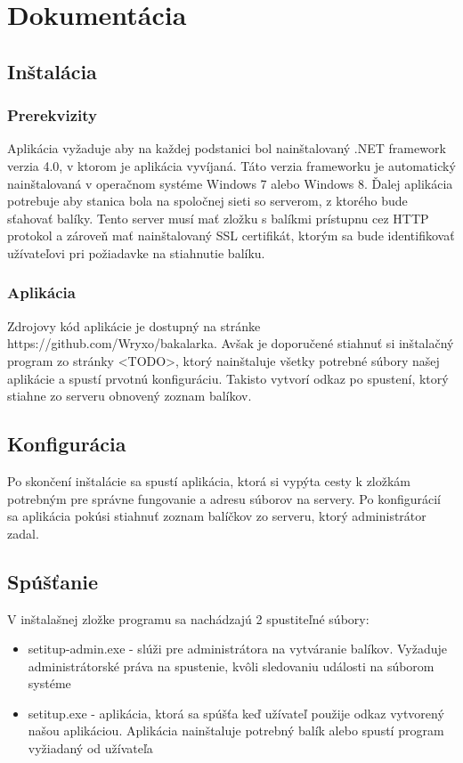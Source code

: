 \chapter{Dokumentácia}

\section{Inštalácia}
\subsection{Prerekvizity}
Aplikácia vyžaduje aby na každej podstanici bol nainštalovaný .NET framework verzia 4.0, v ktorom je aplikácia vyvíjaná. Táto verzia frameworku je automatický nainštalovaná v operačnom systéme Windows 7 alebo Windows 8. Ďalej aplikácia potrebuje aby stanica bola na spoločnej sieti so serverom, z ktorého bude sťahovať balíky. Tento server musí mať zložku s balíkmi prístupnu cez HTTP protokol a zároveň mať nainštalovaný SSL certifikát, ktorým sa bude identifikovať užívateľovi pri požiadavke na stiahnutie balíku.
\subsection{Aplikácia}
Zdrojovy kód aplikácie je dostupný na stránke https://github.com/Wryxo/bakalarka. Avšak je doporučené stiahnuť si inštalačný program zo stránky <TODO>, ktorý nainštaluje všetky potrebné súbory našej aplikácie a spustí prvotnú konfiguráciu. Takisto vytvorí odkaz po spustení, ktorý stiahne zo serveru obnovený zoznam balíkov.

\section{Konfigurácia}
Po skončení inštalácie sa spustí aplikácia, ktorá si vypýta cesty k zložkám potrebným pre správne fungovanie a adresu súborov na servery. Po konfigurácií sa aplikácia pokúsi stiahnuť zoznam balíčkov zo serveru, ktorý administrátor zadal.

\section{Spúšťanie}
V inštalašnej zložke programu sa nachádzajú 2 spustiteľné súbory:
\begin{itemize}
\item setitup-admin.exe - slúži pre administrátora na vytváranie balíkov. Vyžaduje administrátorské práva na spustenie, kvôli sledovaniu události na súborom systéme
\item setitup.exe - aplikácia, ktorá sa spúšťa keď užívateľ použije odkaz vytvorený našou aplikáciou. Aplikácia nainštaluje potrebný balík alebo spustí program vyžiadaný od užívateľa
\end{itemize}


